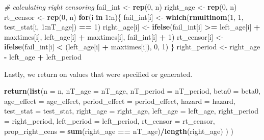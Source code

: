 \documentclass[11pt,]{article}
\newenvironment{Shaded}{\begin{snugshade}}{\end{snugshade}}
\newcommand{\KeywordTok}[1]{\textcolor[rgb]{0.13,0.29,0.53}{\textbf{#1}}}
\newcommand{\DataTypeTok}[1]{\textcolor[rgb]{0.13,0.29,0.53}{#1}}
\newcommand{\DecValTok}[1]{\textcolor[rgb]{0.00,0.00,0.81}{#1}}
\newcommand{\StringTok}[1]{\textcolor[rgb]{0.31,0.60,0.02}{#1}}
\newcommand{\CommentTok}[1]{\textcolor[rgb]{0.56,0.35,0.01}{\textit{#1}}}
\newcommand{\ControlFlowTok}[1]{\textcolor[rgb]{0.13,0.29,0.53}{\textbf{#1}}}
\newcommand{\OperatorTok}[1]{\textcolor[rgb]{0.81,0.36,0.00}{\textbf{#1}}}
\newcommand{\NormalTok}[1]{#1}
\begin{document}
\begin{Shaded}
\begin{Highlighting}[]
\CommentTok{# calculating right censoring}
\NormalTok{  fail_int <-}\StringTok{ }\KeywordTok{rep}\NormalTok{(}\DecValTok{0}\NormalTok{, n)}
\NormalTok{  right_age <-}\StringTok{ }\KeywordTok{rep}\NormalTok{(}\DecValTok{0}\NormalTok{, n)}
\NormalTok{  rt_censor <-}\StringTok{ }\KeywordTok{rep}\NormalTok{(}\DecValTok{0}\NormalTok{, n)}
  \ControlFlowTok{for}\NormalTok{(i }\ControlFlowTok{in} \DecValTok{1}\OperatorTok{:}\NormalTok{n)\{}
\NormalTok{    fail_int[i] <-}\StringTok{ }\KeywordTok{which}\NormalTok{(}\KeywordTok{rmultinom}\NormalTok{(}\DecValTok{1}\NormalTok{, }\DecValTok{1}\NormalTok{, test_stat[i, }\DecValTok{1}\OperatorTok{:}\NormalTok{nT_age]) }\OperatorTok{==}\StringTok{ }\DecValTok{1}\NormalTok{)}
\NormalTok{    right_age[i] <-}\StringTok{ }\KeywordTok{ifelse}\NormalTok{(fail_int[i] }\OperatorTok{>=}\StringTok{ }\NormalTok{left_age[i] }\OperatorTok{+}\StringTok{ }\NormalTok{maxtimes[i],}
\NormalTok{                          left_age[i] }\OperatorTok{+}\StringTok{ }\NormalTok{maxtimes[i],}
\NormalTok{                          fail_int[i] }\OperatorTok{+}\StringTok{ }\DecValTok{1}\NormalTok{)}
\NormalTok{    rt_censor[i] <-}\StringTok{ }\KeywordTok{ifelse}\NormalTok{(fail_int[i] }\OperatorTok{<}\StringTok{ }\NormalTok{(left_age[i] }\OperatorTok{+}\StringTok{ }\NormalTok{maxtimes[i]), }\DecValTok{0}\NormalTok{, }\DecValTok{1}\NormalTok{)}
\NormalTok{  \}}
\NormalTok{  right_period <-}\StringTok{ }\NormalTok{right_age }\OperatorTok{-}\StringTok{ }\NormalTok{left_age }\OperatorTok{+}\StringTok{ }\NormalTok{left_period}
\end{Highlighting}
\end{Shaded}

Lastly, we return on values that were specified or generated.

\begin{Shaded}
\begin{Highlighting}[]
  \KeywordTok{return}\NormalTok{(}\KeywordTok{list}\NormalTok{(}\DataTypeTok{n =}\NormalTok{ n,}
              \DataTypeTok{nT_age =}\NormalTok{ nT_age,}
              \DataTypeTok{nT_period =}\NormalTok{ nT_period,}
              \DataTypeTok{beta0 =}\NormalTok{ beta0,}
              \DataTypeTok{age_effect =}\NormalTok{ age_effect,}
              \DataTypeTok{period_effect =}\NormalTok{ period_effect,}
              \DataTypeTok{hazard =}\NormalTok{ hazard,}
              \DataTypeTok{test_stat =}\NormalTok{ test_stat,}
              \DataTypeTok{right_age =}\NormalTok{ right_age,}
              \DataTypeTok{left_age =}\NormalTok{ left_age,}
              \DataTypeTok{right_period =}\NormalTok{ right_period,}
              \DataTypeTok{left_period =}\NormalTok{ left_period,}
              \DataTypeTok{rt_censor =}\NormalTok{ rt_censor,}
              \DataTypeTok{prop_right_cens =} \KeywordTok{sum}\NormalTok{(right_age }\OperatorTok{==}\StringTok{ }\NormalTok{nT_age)}\OperatorTok{/}\KeywordTok{length}\NormalTok{(right_age)}
\NormalTok{              )}
\NormalTok{  )}
\end{Highlighting}
\end{Shaded}
\end{document}
